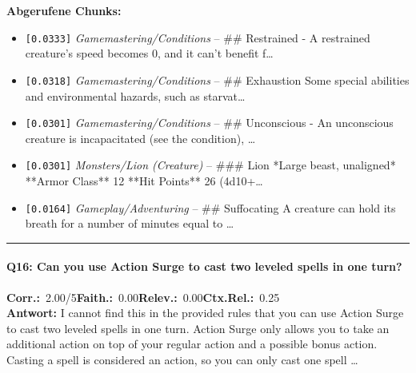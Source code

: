 \noindent\textbf{Abgerufene Chunks:}
\begin{itemize}[noitemsep, topsep=2pt]
  \item[\textbf{\#1}] \texttt{[0.0333]} \textit{Gamemastering/Conditions} -- \#\# Restrained  - A restrained creature's speed becomes 0, and it can't benefit f\ldots
  \item[\textbf{\#2}] \texttt{[0.0318]} \textit{Gamemastering/Conditions} -- \#\# Exhaustion  Some special abilities and environmental hazards, such as starvat\ldots
  \item[\textbf{\#3}] \texttt{[0.0301]} \textit{Gamemastering/Conditions} -- \#\# Unconscious  - An unconscious creature is incapacitated (see the condition), \ldots
  \item[\textbf{\#4}] \texttt{[0.0301]} \textit{Monsters/Lion (Creature)} -- \#\#\# Lion  *Large beast, unaligned*  **Armor Class** 12  **Hit Points** 26 (4d10+\ldots
  \item[\textbf{\#5}] \texttt{[0.0164]} \textit{Gameplay/Adventuring} -- \#\# Suffocating  A creature can hold its breath for a number of minutes equal to \ldots
\end{itemize}
\vspace{4pt}
\hrule
\vspace{6pt}

\paragraph{Q16: Can you use Action Surge to cast two leveled spells in one turn?}
\noindent \textbf{Corr.:}~2.00/5\quad \textbf{Faith.:}~0.00\quad \textbf{Relev.:}~0.00\quad \textbf{Ctx.Rel.:}~0.25\\

\noindent\textbf{Antwort:} I cannot find this in the provided rules that you can use Action Surge to cast two leveled spells in one turn. Action Surge only allows you to take an additional action on top of your regular action and a possible bonus action. Casting a spell is considered an action, so you can only cast one spell \ldots

